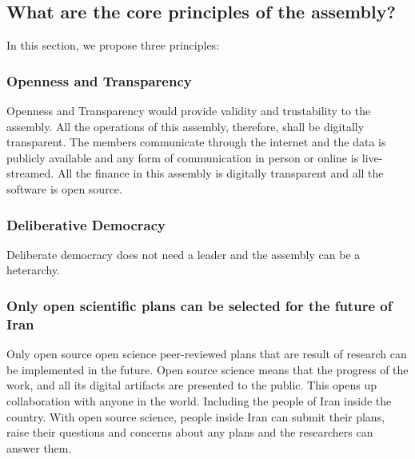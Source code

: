 \documentclass{IEEEtran}
\begin{document}
\begin{enumerate}
\subsection{What are the core principles of the assembly?}
In this section, we propose three principles:
\subsubsection{Openness and Transparency}
Openness and Transparency would provide validity and trustability to the assembly. All the operations of this assembly, therefore, shall be digitally transparent. The members communicate through the internet and the data is publicly available and any form of communication in person or online is live-streamed. All the finance in this assembly is digitally transparent and all the software is open source.

\subsubsection{Deliberative Democracy}
Deliberate democracy does not need a leader and the assembly can be a heterarchy. 

\subsubsection{Only open scientific plans can be selected for the future of Iran}
Only open source open science peer-reviewed plans that are result of research can be implemented in the future. 
Open source science means that the progress of the work, and all its digital artifacts are presented to the public.
This opens up collaboration with anyone in the world. Including the people of Iran inside the country.
With open source science, people inside Iran can submit their plans, raise their questions and concerns about any plans and the researchers can answer them.




\end{enumerate}
\end{document}
